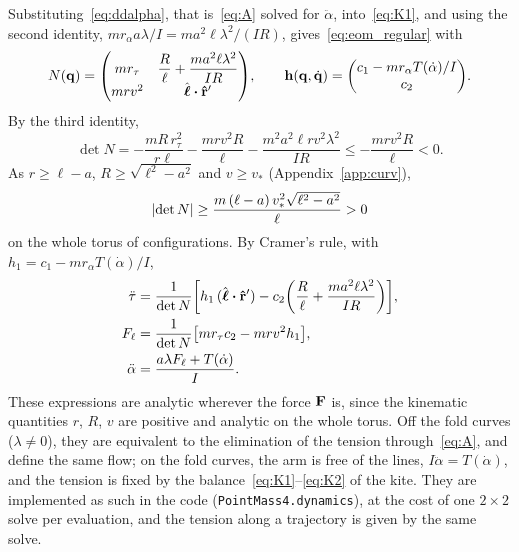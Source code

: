 Substituting~\eqref{eq:ddalpha}, that is~\eqref{eq:A} solved for \(\ddot\alpha\), into~\eqref{eq:K1}, and using the second identity, \(m r_\alpha a\lambda/I = m a^2\ell\lambda^2/(IR)\), gives~\eqref{eq:eom_regular} with
\begin{equation}
    N(\vq) = \mqty(m r_\tau & \dfrac{R}{\ell} + \dfrac{m a^2\ell\lambda^2}{IR} \\ m r v^2 & \hat{\boldsymbol{\ell}}\vdot\vu r'),
    \qquad
    \vb h(\vq,\dq) = \mqty(c_1 - m r_\alpha T(\dot\alpha)/I \\ c_2).
\end{equation}
By the third identity,
\begin{equation} \label{eq:detN}
    \det N = -\frac{m R\,r_\tau^2}{r\ell} - \frac{m r v^2 R}{\ell} - \frac{m^2 a^2\ell r v^2\lambda^2}{IR} \leq -\frac{m r v^2 R}{\ell} < 0.
\end{equation}
As \(r\geq\ell-a\), \(R\geq\sqrt{\ell^2-a^2}\) and \(v\geq v_*\) (Appendix~\ref{app:curv}),
\begin{equation}
    \abs{\det N} \geq \frac{m\,(\ell-a)\,v_*^2\sqrt{\ell^2-a^2}}{\ell} > 0
\end{equation}
on the whole torus of configurations.
By Cramer's rule, with \(h_1 = c_1 - m r_\alpha T(\dot\alpha)/I\),
\begin{align}
    \ddot\tau &= \frac{1}{\det N}\qty[h_1\,(\hat{\boldsymbol{\ell}}\vdot\vu r') - c_2\qty(\frac{R}{\ell} + \frac{m a^2\ell\lambda^2}{IR})], \\
    F_\ell &= \frac{1}{\det N}\qty[m r_\tau c_2 - m r v^2 h_1], \\
    \ddot\alpha &= \frac{a\lambda F_\ell + T(\dot\alpha)}{I}.
\end{align}
These expressions are analytic wherever the force \(\vb F\) is, since the kinematic quantities \(r\), \(R\), \(v\) are positive and analytic on the whole torus.
Off the fold curves (\(\lambda\neq0\)), they are equivalent to the elimination of the tension through~\eqref{eq:A}, and define the same flow; on the fold curves, the arm is free of the lines, \(I\ddot\alpha = T(\dot\alpha)\), and the tension is fixed by the balance~\eqref{eq:K1}--\eqref{eq:K2} of the kite.
They are implemented as such in the code (\texttt{PointMass4.dynamics}), at the cost of one \(2\times2\) solve per evaluation, and the tension along a trajectory is given by the same solve.
